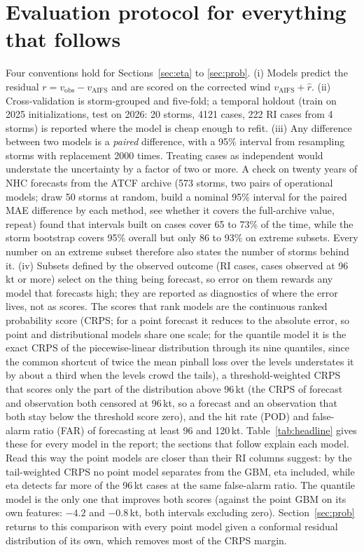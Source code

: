 \documentclass[11pt]{article}
\begin{document}
\FloatBarrier
\section{Evaluation protocol for everything that follows}\label{sec:protocol}

Four conventions hold for Sections~\ref{sec:eta} to \ref{sec:prob}. (i) Models predict the
residual $r = v_{\mathrm{obs}} - v_{\mathrm{AIFS}}$ and are scored on the corrected wind
$v_{\mathrm{AIFS}} + \hat r$. (ii) Cross-validation is storm-grouped and five-fold; a temporal
holdout (train on 2025 initializations, test on 2026: 20 storms, 4121 cases, 222 RI cases from
4 storms) is reported where the model is cheap enough to refit. (iii) Any difference between two
models is a \emph{paired} difference, with a 95\% interval from resampling storms with
replacement 2000 times. Treating cases as independent would understate the uncertainty by a
factor of two or more. A check on twenty years of NHC forecasts from the ATCF archive (573
storms, two pairs of operational models; draw 50 storms at random, build a nominal 95\% interval
for the paired MAE difference by each method, see whether it covers the full-archive value,
repeat) found that intervals built on cases cover 65 to 73\% of the time, while the storm
bootstrap covers 95\% overall but only 86 to 93\% on extreme subsets. Every number on an extreme subset therefore
also states the number of storms behind it. (iv) Subsets defined by the observed outcome (RI
cases, cases observed at 96\,kt or more) select on the thing being forecast, so error on them
rewards any model that forecasts high; they are reported as diagnostics of where the error lives,
not as scores. The scores that rank models are the continuous ranked probability score (CRPS;
for a point forecast it reduces to the absolute error, so point and distributional models share
one scale; for the quantile model it is the exact CRPS of the piecewise-linear distribution
through its nine quantiles, since the common shortcut of twice the mean pinball loss over the
levels understates it by about a third when the levels crowd the tails), a threshold-weighted CRPS \citep{gneiting2011twcrps} that scores only the part of the
distribution above 96\,kt (the CRPS of forecast and observation both censored at 96\,kt, so a
forecast and an observation that both stay below the threshold score zero), and the hit rate (POD)
and false-alarm ratio (FAR) of forecasting at least 96 and 120\,kt. Table~\ref{tab:headline}
gives these for every model in the report; the sections that follow explain each model. Read
this way the point models are closer than their RI columns suggest: by the
tail-weighted CRPS no point model separates from the GBM, eta included, while eta detects far more
of the 96\,kt cases at the same false-alarm ratio. The quantile model is the only one that improves
both scores (against the point GBM on its own features: $-4.2$ and $-0.8$\,kt, both intervals
excluding zero). Section~\ref{sec:prob} returns to this comparison with every point model given
a conformal residual distribution of its own, which removes most of the CRPS margin.
\end{document}
